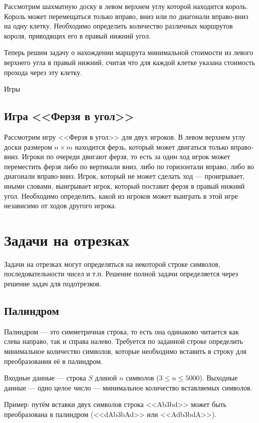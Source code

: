 \documentclass[14pt,openany]{book}
\begin{document}
Рассмотрим шахматную доску в левом верхнем углу которой находится король. Король может перемещаться только вправо, вниз или по диагонали вправо-вниз на одну клетку. Необходимо определить количество различных маршрутов короля, приводящих его в правый нижний угол.

Теперь решим задачу о нахождении маршрута минимальной стоимости из левого верхнего угла в правый нижний, считая что для каждой клетке указана стоимость прохода через эту клетку.

Игры

\section{Игра <<Ферзя в угол>>}

Рассмотрим игру <<Ферзя в угол>> для двух игроков. В левом верхнем углу доски размером $n \times m$ 
находится ферзь, который может двигаться только вправо-вниз. Игроки по очереди двигают ферзя, то есть 
за один ход игрок может переместить ферзя либо по вертикали вниз, либо по горизонтали вправо, либо во 
диагонали вправо-вниз. Игрок, который не может сделать ход — проигрывает, иными словами, выигрывает 
игрок, который поставит ферзя в правый нижний угол. Необходимо определить, какой из игроков может 
выиграть в этой игре независимо от ходов другого игрока.


\chapter{Задачи на отрезках}

Задачи на отрезках могут определяться на некоторой строке символов, последовательности чисел
и т.п. Решение полной задачи определяется через решение задач для подотрезков.

\section{Палиндром}

Палиндром --- это симметричная строка, то есть она одинаково читается как слева направо,
так и справа налево. Требуется по заданной строке определить минимальное количество
символов,
которые необходимо вставить в строку для преобразования её в палиндром.

Входные данные --- строка $S$ длиной $n$ символов ($3 \le n \le 5000$).
Выходные данные --- одно целое число --- минимальное количество вставляемых символов.

Пример: путём вставки двух символов строка <<Ab3bd>> может быть преобразована
в палиндром (<<dAb3bAd>> или <<Adb3bdA>>).
\end{document}
